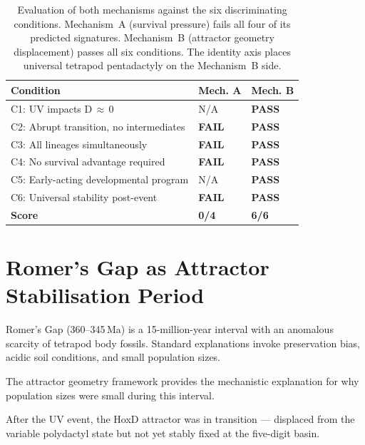 \documentclass[11pt, a4paper]{article}
\begin{document}
\begin{table}[h]
\centering
\small
\begin{tabularx}{\linewidth}{p{6cm}p{1.5cm}p{1.5cm}}
\toprule
\textbf{Condition} &
\textbf{Mech. A} &
\textbf{Mech. B} \\
\midrule
C1: UV impacts D\,$\approx$\,0 &
  N/A &
  \textcolor{confirmgreen}{\textbf{PASS}} \\[0.2em]
C2: Abrupt transition, no intermediates &
  \textcolor{warningred}{\textbf{FAIL}} &
  \textcolor{confirmgreen}{\textbf{PASS}} \\[0.2em]
C3: All lineages simultaneously &
  \textcolor{warningred}{\textbf{FAIL}} &
  \textcolor{confirmgreen}{\textbf{PASS}} \\[0.2em]
C4: No survival advantage required &
  \textcolor{warningred}{\textbf{FAIL}} &
  \textcolor{confirmgreen}{\textbf{PASS}} \\[0.2em]
C5: Early-acting developmental program &
  N/A &
  \textcolor{confirmgreen}{\textbf{PASS}} \\[0.2em]
C6: Universal stability post-event &
  \textcolor{warningred}{\textbf{FAIL}} &
  \textcolor{confirmgreen}{\textbf{PASS}} \\
\midrule
\textbf{Score} &
  \textbf{0/4} &
  \textbf{6/6} \\
\bottomrule
\end{tabularx}
\caption{Evaluation of both mechanisms against
  the six discriminating conditions.
  Mechanism~A (survival pressure) fails all four
  of its predicted signatures.
  Mechanism~B (attractor geometry displacement)
  passes all six conditions.
  The identity axis places universal tetrapod
  pentadactyly on the Mechanism~B side.}
\end{table}

\section{Romer's Gap as Attractor Stabilisation
Period}

Romer's Gap (360--345\,Ma) is a 15-million-year
interval with an anomalous scarcity of tetrapod
body fossils.
Standard explanations invoke preservation bias,
acidic soil conditions, and small population sizes.

The attractor geometry framework provides the
mechanistic explanation for why population sizes
were small during this interval.

After the UV event, the HoxD attractor was in
transition --- displaced from the variable polydactyl
state but not yet stably fixed at the five-digit
basin.
\end{document}

